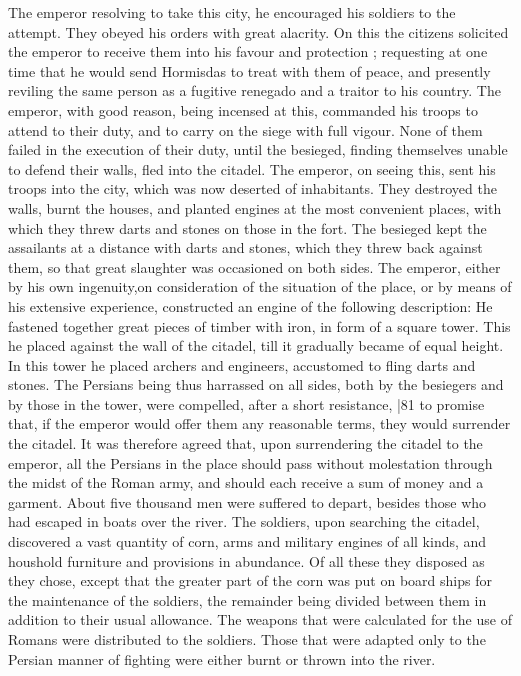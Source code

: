 The emperor resolving to take this city, he encouraged his soldiers to the attempt. They obeyed his orders with great alacrity. On this the citizens solicited the emperor to receive them into his favour and protection ; requesting at one time that he would send Hormisdas to treat with them of peace, and presently reviling the same person as a fugitive renegado and a traitor to his country. The emperor, with good reason, being incensed at this, commanded his troops to attend to their duty, and to carry on the siege with full vigour. None of them failed in the execution of their duty, until the besieged, finding themselves unable to defend their walls, fled into the citadel. The emperor, on seeing this, sent his troops into the city, which was now deserted of inhabitants. They destroyed the walls, burnt the houses, and planted engines at the most convenient places, with which they threw darts and stones on those in the fort. The besieged kept the assailants at a distance with darts and stones, which they threw back against them, so that great slaughter was occasioned on both sides. The emperor, either by his own ingenuity,on consideration of the situation of the place, or by means of his extensive experience, constructed an engine of the following description: He fastened together great pieces of timber with iron, in form of a square tower. This he placed against the wall of the citadel, till it gradually became of equal height. In this tower he placed archers and engineers, accustomed to fling darts and stones. The Persians being thus harrassed on all sides, both by the besiegers and by those in the tower, were compelled, after a short resistance,
|81 to promise that, if the emperor would offer them any reasonable terms, they would surrender the citadel. It was therefore agreed that, upon surrendering the citadel to the emperor, all the Persians in the place should pass without molestation through the midst of the Roman army, and should each receive a sum of money and a garment. About five thousand men were suffered to depart, besides those who had escaped in boats over the river. The soldiers, upon searching the citadel, discovered a vast quantity of corn, arms and military engines of all kinds, and houshold furniture and provisions in abundance. Of all these they disposed as they chose, except that the greater part of the corn was put on board ships for the maintenance of the soldiers, the remainder being divided between them in addition to their usual allowance. The weapons that were calculated for the use of Romans were distributed to the soldiers. Those that were adapted only to the Persian manner of fighting were either burnt or thrown into the river.

